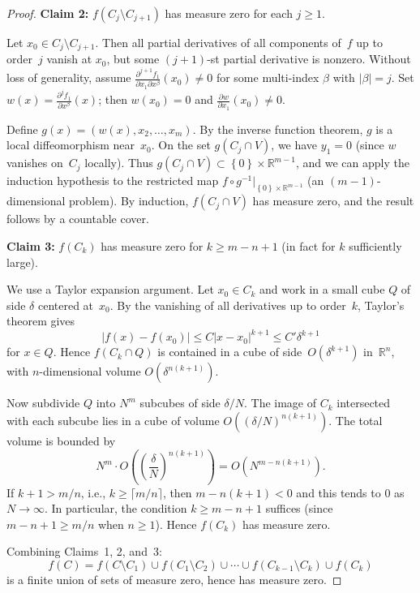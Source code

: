 \documentclass[12pt,a4paper,openany]{book}
\theoremstyle{definition}
\theoremstyle{remark}
\newcommand{\R}{\mathbb{R}}
\newcommand{\abs}[1]{\left\lvert #1 \right\rvert}
\newcommand{\set}[1]{\left\{ #1 \right\}}
\begin{document}
\begin{proof}
\medskip\noindent\textbf{Claim 2:} $f(C_j\setminus C_{j+1})$ has
measure zero for each $j\ge 1$.

Let $x_0\in C_j\setminus C_{j+1}$.  Then all partial derivatives of
all components of~$f$ up to order~$j$ vanish at $x_0$, but some
$(j{+}1)$-st partial derivative is nonzero.  Without loss of generality,
assume $\frac{\partial^{j+1} f_1}{\partial x_1\partial x^\beta}(x_0)\ne 0$
for some multi-index $\beta$ with $\abs{\beta} = j$.  Set
$w(x) = \frac{\partial^j f_1}{\partial x^\beta}(x)$; then $w(x_0)=0$
and $\frac{\partial w}{\partial x_1}(x_0)\ne 0$.

Define $g(x) = (w(x), x_2,\dots,x_m)$.  By the inverse function
theorem, $g$ is a local diffeomorphism near~$x_0$.  On the set
$g(C_j\cap V)$, we have $y_1 = 0$ (since $w$ vanishes on~$C_j$ locally).
Thus $g(C_j\cap V)\subset \set{0}\times\R^{m-1}$, and we can apply
the induction hypothesis to the restricted map
$f\circ g^{-1}\big|_{\set{0}\times\R^{m-1}}$
(an $(m-1)$-dimensional problem).  By induction, $f(C_j\cap V)$
has measure zero, and the result follows by a countable cover.

\medskip\noindent\textbf{Claim 3:} $f(C_k)$ has measure zero for
$k\ge m-n+1$ (in fact for $k$ sufficiently large).

We use a Taylor expansion argument.  Let $x_0\in C_k$ and work
in a small cube $Q$ of side $\delta$ centered at~$x_0$.  By the
vanishing of all derivatives up to order~$k$, Taylor's theorem gives
\[
  \abs{f(x) - f(x_0)} \le C\abs{x-x_0}^{k+1}
  \le C'\delta^{k+1}
\]
for $x\in Q$.  Hence $f(C_k\cap Q)$ is contained in a cube of
side~$O(\delta^{k+1})$ in~$\R^n$, with $n$-dimensional volume
$O(\delta^{n(k+1)})$.

Now subdivide $Q$ into $N^m$ subcubes of side $\delta/N$.  The image
of $C_k$ intersected with each subcube lies in a cube of volume
$O((\delta/N)^{n(k+1)})$.  The total volume is bounded by
\[
  N^m \cdot O\!\left(\left(\frac{\delta}{N}\right)^{n(k+1)}\right)
  = O(N^{m - n(k+1)}).
\]
If $k+1 > m/n$, i.e., $k \ge \lceil m/n\rceil$, then $m - n(k+1) < 0$
and this tends to $0$ as $N\to\infty$.  In particular, the condition
$k \ge m - n + 1$ suffices (since $m-n+1 \ge m/n$ when $n\ge 1$).
Hence $f(C_k)$ has measure zero.

\medskip
Combining Claims~1, 2, and~3:
\[
  f(C) = f(C\setminus C_1) \cup f(C_1\setminus C_2) \cup \cdots
  \cup f(C_{k-1}\setminus C_k) \cup f(C_k)
\]
is a finite union of sets of measure zero, hence has measure zero.
\end{proof}
\end{document}
